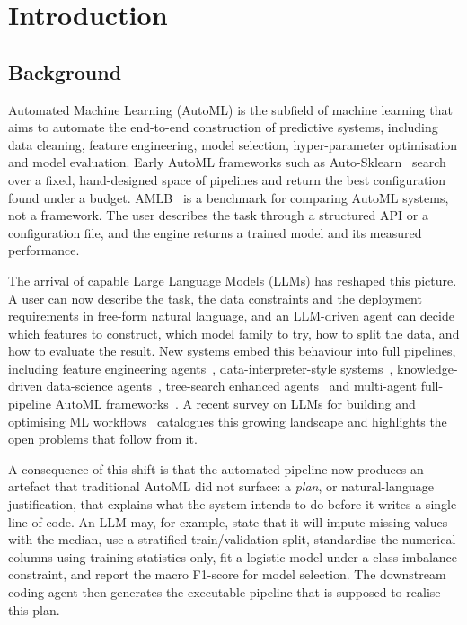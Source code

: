 \chapter{Introduction}
\label{ch:intro}

\section{Background}

Automated Machine Learning (AutoML) is the subfield of machine
learning that aims to automate the end-to-end construction of
predictive systems, including data cleaning, feature engineering,
model selection, hyper-parameter optimisation and model evaluation.
Early AutoML frameworks such as Auto-Sklearn~\cite{autosklearn}
search over a fixed, hand-designed space of pipelines and return the
best configuration found under a budget. AMLB~\cite{amlb} is a
benchmark for comparing AutoML systems, not a framework.
The user describes the task through a structured API or a
configuration file, and the engine returns a trained model and its
measured performance.

The arrival of capable Large Language Models (LLMs) has reshaped this
picture. A user can now describe the task, the data constraints and
the deployment requirements in free-form natural language, and an
LLM-driven agent can decide which features to construct, which
model family to try, how to split the data, and how to evaluate the
result. New systems embed this behaviour into full pipelines,
including feature engineering agents~\cite{caafe},
data-interpreter-style systems~\cite{datainterpreter},
knowledge-driven data-science agents~\cite{dsagent},
tree-search enhanced agents~\cite{sela} and multi-agent
full-pipeline AutoML frameworks~\cite{automlagent}. A recent survey
on LLMs for building and optimising ML workflows~\cite{llmauto}
catalogues this growing landscape and highlights the open problems
that follow from it.

A consequence of this shift is that the automated pipeline now
produces an artefact that traditional AutoML did not surface: a
\emph{plan}, or natural-language justification, that explains what
the system intends to do before it writes a single line of code. An
LLM may, for example, state that it will impute missing values with
the median, use a stratified train/validation split, standardise the
numerical columns using training statistics only, fit a logistic
model under a class-imbalance constraint, and report the macro
F1-score for model selection. The downstream coding agent then
generates the executable pipeline that is supposed to realise this
plan.

